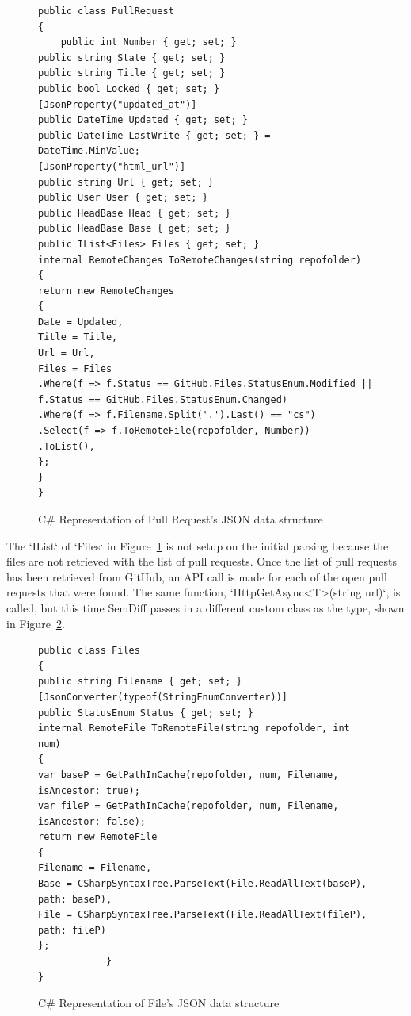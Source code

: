 \documentclass[draftclsnofoot,onecolumn]{IEEEtran}
\begin{document}
\begin{figure}[!t]
\centering
\begin{lstlisting}
public class PullRequest
{
 	public int Number { get; set; }
public string State { get; set; }
public string Title { get; set; }
public bool Locked { get; set; }
[JsonProperty("updated_at")]
public DateTime Updated { get; set; }
public DateTime LastWrite { get; set; } = DateTime.MinValue;
[JsonProperty("html_url")]
public string Url { get; set; }
public User User { get; set; }
public HeadBase Head { get; set; }
public HeadBase Base { get; set; }
public IList<Files> Files { get; set; }
internal RemoteChanges ToRemoteChanges(string repofolder)
{
return new RemoteChanges
{
Date = Updated,
Title = Title,
Url = Url,
Files = Files
.Where(f => f.Status == GitHub.Files.StatusEnum.Modified || f.Status == GitHub.Files.StatusEnum.Changed)
.Where(f => f.Filename.Split('.').Last() == "cs")
.Select(f => f.ToRemoteFile(repofolder, Number))
.ToList(),
};
}
}
\end{lstlisting}
\caption{C\# Representation of Pull Request’s JSON data structure}
\label{PullRequestCode}
\end{figure}

The `IList` of `Files` in Figure~\ref{PullRequestCode} is not setup on the 
initial parsing because the files are not retrieved with the list of pull 
requests. Once the list of pull requests has been retrieved from GitHub, an 
API call is made for each of the open pull requests that were found. The 
same function, `HttpGetAsync<T>(string url)`, is called, but this time 
SemDiff passes in a different custom class as the type, shown in 
Figure~\ref{GitHubFiles}.

\begin{figure}[!t]
\centering
\begin{lstlisting}
public class Files
{
public string Filename { get; set; }
[JsonConverter(typeof(StringEnumConverter))]
public StatusEnum Status { get; set; }
internal RemoteFile ToRemoteFile(string repofolder, int num)	
{
var baseP = GetPathInCache(repofolder, num, Filename, isAncestor: true);
var fileP = GetPathInCache(repofolder, num, Filename, isAncestor: false);
return new RemoteFile
{
Filename = Filename,
Base = CSharpSyntaxTree.ParseText(File.ReadAllText(baseP), path: baseP),
File = CSharpSyntaxTree.ParseText(File.ReadAllText(fileP), path: fileP)
};
        	}
}
\end{lstlisting}
\caption{C\# Representation of File's JSON data structure}
\label{GitHubFiles}
\end{figure}
\end{document}
